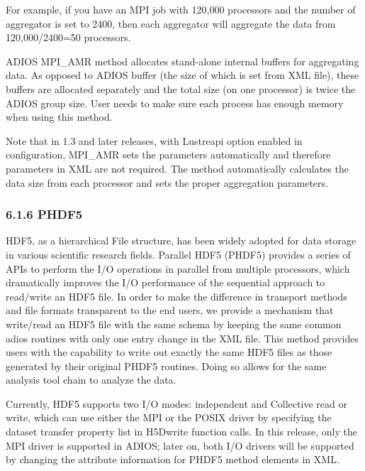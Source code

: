 \vspace{22pt}
For example, if you have an MPI job with 120,000 processors and the number of aggregator 
is set to 2400, then each aggregator will aggregate the data from 120,000/2400=50 
processors.

\vspace{10pt}
ADIOS MPI\_AMR method allocates stand-alone internal buffers for aggregating data. 
As opposed to ADIOS buffer (the size of which is set from XML file), these buffers 
are allocated separately and the total size (on one processor) is twice the ADIOS 
group size. User needs to make sure each process has enough memory when using this 
method.  

\vspace{10pt}
Note that in 1.3 and later releases, with Lustreapi option enabled in configuration, 
MPI\_AMR sets the parameters automatically and therefore parameters in XML are 
not required. The method automatically calculates the data size from each processor 
and sets the proper aggregation parameters.\label{HToc84890261}\label{HToc212016637}\label{HToc212016879}\label{HToc182553386}

\vspace{10pt}
\subsubsection*{{\large \textbf{6.1.6 PHDF5}}}

\vspace{10pt}
HDF5, as a hierarchical File structure, has been widely adopted for data storage 
in various scientific research fields.  Parallel HDF5 (PHDF5) provides a series 
of APIs to perform the I/O operations in parallel from multiple processors, which 
dramatically improves the I/O performance of the sequential approach to read/write 
an HDF5 file. In order to make the difference in transport methods and file formats 
transparent to the end users, we provide a mechanism that write/read an HDF5 file 
with the same schema by keeping the same common adios routines with only one entry 
change in the XML file. This method provides users with the capability to write 
out exactly the same HDF5 files as those generated by their original PHDF5 routines. 
Doing so allows for the same analysis tool chain to analyze the data. 

\vspace{10pt}
Currently, HDF5 supports two I/O modes: independent and Collective read or write, 
which can use either the MPI or the POSIX driver by specifying the dataset transfer 
property list in H5Dwrite function calls. In this release, only the MPI driver 
is supported in ADIOS; later on, both I/O drivers will be supported by changing 
the attribute information for PHDF5 method elements in XML. \label{HToc182553387}

